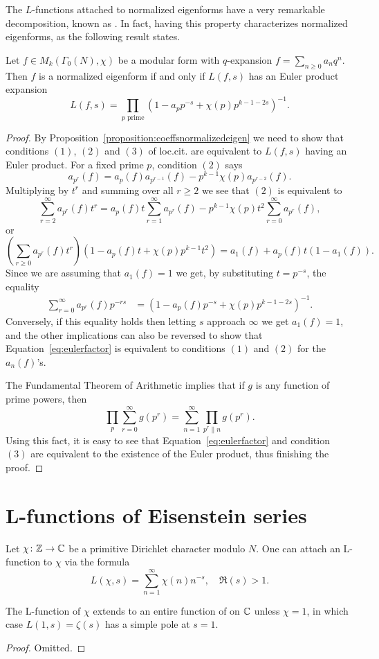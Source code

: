 The $L$-functions attached to normalized eigenforms have a very remarkable decomposition, known as . In fact, having this property characterizes normalized eigenforms, as the following result states.
\begin{theorem}
  Let $f\in M_k(\Gamma_0(N),\chi)$ be a modular form with $q$-expansion $f=\sum_{n\geq 0} a_n q^n$. Then $f$ is a normalized eigenform if and only if $L(f,s)$ has an Euler product expansion
\[
L(f,s)=\prod_{p\text{ prime}} (1-a_pp^{-s}+\chi(p)p^{k-1-2s})^{-1}.
\]
\end{theorem}
\begin{proof}
  By Proposition~\ref{proposition:coeffsnormalizedeigen} we need to show that conditions $(1)$, $(2)$ and $(3)$ of loc.cit. are equivalent to $L(f,s)$ having an Euler product. For a fixed prime $p$, condition $(2)$ says
\[
a_{p^r}(f) = a_p(f)a_{p^{r-1}}(f) - p^{k-1}\chi(p) a_{p^{r-2}}(f).
\]
Multiplying by $t^r$ and summing over all $r\geq 2$ we see that $(2)$ is equivalent to
\[
\sum_{r=2}^\infty a_{p^r}(f)t^r=a_p(f)t\sum_{r=1}^\infty a_{p^{r}}(f)-p^{k-1}\chi(p)t^2\sum_{r=0}^\infty a_{p^{r}}(f),
\]
or
\[
\left(\sum_{r\geq 0} a_{p^r}(f)t^r\right)(1-a_p(f)t+\chi(p)p^{k-1}t^2) = a_1(f)+a_p(f)t(1-a_1(f)).
\]
Since we are assuming that $a_1(f)=1$ we get, by substituting $t=p^{-s}$, the equality
\begin{align}
\label{eq:eulerfactor}
\sum_{r=0}^{\infty} a_{p^r}(f)p^{-rs} &= (1-a_p(f)p^{-s}+\chi(p)p^{k-1-2s})^{-1}.
\end{align}
Conversely, if this equality holds then letting $s$ approach $\infty$ we get $a_1(f)=1$, and the other implications can also be reversed to show that Equation~\ref{eq:eulerfactor} is equivalent to conditions $(1)$ and $(2)$ for the $a_n(f)$'s.

The Fundamental Theorem of Arithmetic implies that if $g$ is any function of prime powers, then
\[
\prod_p \sum_{r=0}^\infty g(p^r) = \sum_{n=1}^\infty \prod_{p^r\| n} g(p^r).
\]
Using this fact, it is easy to see that Equation~\ref{eq:eulerfactor} and condition $(3)$ are equivalent to the existence of the Euler product, thus finishing the proof.
\end{proof}

\section{L-functions of Eisenstein series}
Let $\chi\colon\mathbb{Z}\to\mathbb{C}$ be a primitive Dirichlet character modulo $N$. One can attach an L-function to $\chi$ via the formula
\[
L(\chi,s)=\sum_{n=1}^\infty \chi(n)n^{-s},\quad \Re(s)>1.
\]
\begin{proposition}
  The L-function of $\chi$ extends to an entire function of on $\mathbb{C}$ unless $\chi=1$, in which case $L(1,s)=\zeta(s)$ has a simple pole at $s=1$.
\end{proposition}
\begin{proof}
  Omitted.
\end{proof}

